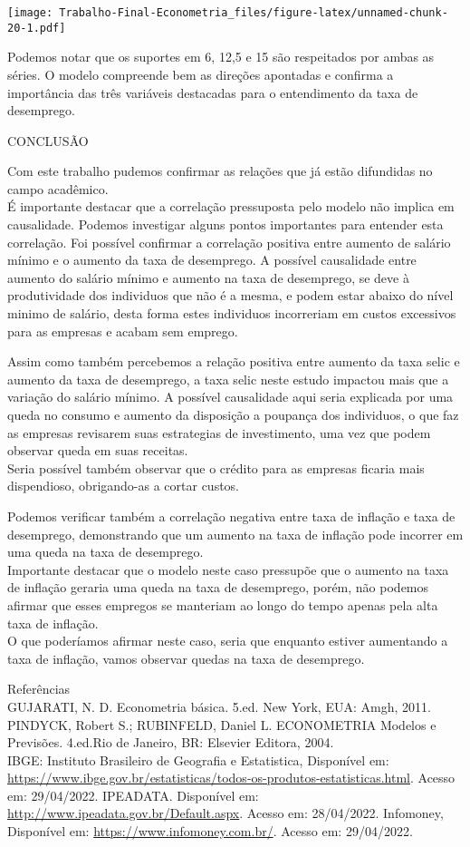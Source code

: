 \documentclass[
]{article}
\begin{document}
\texttt{[image: Trabalho-Final-Econometria\_files/figure-latex/unnamed-chunk-20-1.pdf]}

Podemos notar que os suportes em 6, 12,5 e 15 são respeitados por ambas
as séries. O modelo compreende bem as direções apontadas e confirma a
importância das três variáveis destacadas para o entendimento da taxa de
desemprego.

CONCLUSÃO

Com este trabalho pudemos confirmar as relações que já estão difundidas
no campo acadêmico.\\
É importante destacar que a correlação pressuposta pelo modelo não
implica em causalidade. Podemos investigar alguns pontos importantes
para entender esta correlação. Foi possível confirmar a correlação
positiva entre aumento de salário mínimo e o aumento da taxa de
desemprego. A possível causalidade entre aumento do salário mínimo e
aumento na taxa de desemprego, se deve à produtividade dos individuos
que não é a mesma, e podem estar abaixo do nível minimo de salário,
desta forma estes individuos incorreriam em custos excessivos para as
empresas e acabam sem emprego.

Assim como também percebemos a relação positiva entre aumento da taxa
selic e aumento da taxa de desemprego, a taxa selic neste estudo
impactou mais que a variação do salário mínimo. A possível causalidade
aqui seria explicada por uma queda no consumo e aumento da disposição a
poupança dos individuos, o que faz as empresas revisarem suas
estrategias de investimento, uma vez que podem observar queda em suas
receitas.\\
Seria possível também observar que o crédito para as empresas ficaria
mais dispendioso, obrigando-as a cortar custos.

Podemos verificar também a correlação negativa entre taxa de inflação e
taxa de desemprego, demonstrando que um aumento na taxa de inflação pode
incorrer em uma queda na taxa de desemprego.\\
Importante destacar que o modelo neste caso pressupõe que o aumento na
taxa de inflação geraria uma queda na taxa de desemprego, porém, não
podemos afirmar que esses empregos se manteriam ao longo do tempo apenas
pela alta taxa de inflação.\\
O que poderíamos afirmar neste caso, seria que enquanto estiver
aumentando a taxa de inflação, vamos observar quedas na taxa de
desemprego.

Referências\\
GUJARATI, N. D. Econometria básica. 5.ed. New York, EUA: Amgh, 2011.\\
PINDYCK, Robert S.; RUBINFELD, Daniel L. ECONOMETRIA Modelos e
Previsões. 4.ed.Rio de Janeiro, BR: Elsevier Editora, 2004.\\
IBGE: Instituto Brasileiro de Geografia e Estatistica, Disponível em:
\url{https://www.ibge.gov.br/estatisticas/todos-os-produtos-estatisticas.html}.
Acesso em: 29/04/2022. IPEADATA. Disponível em:
\url{http://www.ipeadata.gov.br/Default.aspx}. Acesso em: 28/04/2022.
Infomoney, Disponível em: \url{https://www.infomoney.com.br/}. Acesso
em: 29/04/2022.
\end{document}
